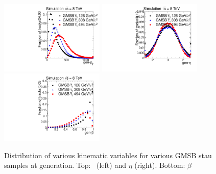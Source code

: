 \begin{figure}
 \begin{center}
  \includegraphics[clip=false, trim=0.0cm 0cm 1.4cm 0cm, width=0.44\textwidth]{figures/muonly/Selection_Comp_GMStau_genpT}
  \includegraphics[clip=false, trim=0.0cm 0cm 1.4cm 0cm, width=0.44\textwidth]{figures/muonly/Selection_Comp_GMStau_geneta}
  \includegraphics[clip=false, trim=0.0cm 0cm 1.4cm 0cm, width=0.44\textwidth]{figures/muonly/Selection_Comp_GMStau_genbeta}
 \end{center}
 \caption[Distribution of \pt, $\eta$, and $\beta$ for various GMSB stau samples at generation]
{Distribution of various kinematic variables for various GMSB stau samples at generation.
Top: \pt\ (left) and $\eta$ (right).
Bottom: $\beta$
   \label{fig:GenGMStau}}
\end{figure}

